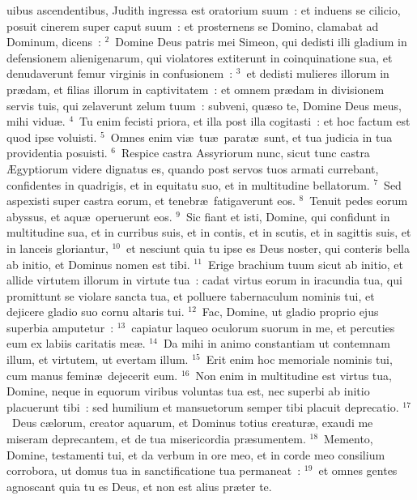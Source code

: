 \bchapter
{}uibus ascendentibus, Judith ingressa est oratorium suum~: et induens se cilicio, posuit cinerem super caput suum~: et prosternens se Domino, clamabat ad Dominum, dicens~:
${}^{2}$~Domine Deus patris mei Simeon, qui dedisti illi gladium in defensionem alienigenarum, qui violatores extiterunt in coinquinatione sua, et denudaverunt femur virginis in confusionem~:
${}^{3}$~et dedisti mulieres illorum in pr\ae dam, et filias illorum in captivitatem~: et omnem pr\ae dam in divisionem servis tuis, qui zelaverunt zelum tuum~: subveni, qu\ae so te, Domine Deus meus, mihi vidu\ae .
${}^{4}$~Tu enim fecisti priora, et illa post illa cogitasti~: et hoc factum est quod ipse voluisti.
${}^{5}$~Omnes enim vi\ae\ tu\ae\ parat\ae\ sunt, et tua judicia in tua providentia posuisti.
${}^{6}$~Respice castra Assyriorum nunc, sicut tunc castra \AE gyptiorum videre dignatus es, quando post servos tuos armati currebant, confidentes in quadrigis, et in equitatu suo, et in multitudine bellatorum.
${}^{7}$~Sed aspexisti super castra eorum, et tenebr\ae\ fatigaverunt eos.
${}^{8}$~Tenuit pedes eorum abyssus, et aqu\ae\ operuerunt eos.
${}^{9}$~Sic fiant et isti, Domine, qui confidunt in multitudine sua, et in curribus suis, et in contis, et in scutis, et in sagittis suis, et in lanceis gloriantur,
${}^{10}$~et nesciunt quia tu ipse es Deus noster, qui conteris bella ab initio, et Dominus nomen est tibi.
${}^{11}$~Erige brachium tuum sicut ab initio, et allide virtutem illorum in virtute tua~: cadat virtus eorum in iracundia tua, qui promittunt se violare sancta tua, et polluere tabernaculum nominis tui, et dejicere gladio suo cornu altaris tui.
${}^{12}$~Fac, Domine, ut gladio proprio ejus superbia amputetur~:
${}^{13}$~capiatur laqueo oculorum suorum in me, et percuties eum ex labiis caritatis me\ae .
${}^{14}$~Da mihi in animo constantiam ut contemnam illum, et virtutem, ut evertam illum.
${}^{15}$~Erit enim hoc memoriale nominis tui, cum manus femin\ae\ dejecerit eum.
${}^{16}$~Non enim in multitudine est virtus tua, Domine, neque in equorum viribus voluntas tua est, nec superbi ab initio placuerunt tibi~: sed humilium et mansuetorum semper tibi placuit deprecatio.
${}^{17}$~Deus c\ae lorum, creator aquarum, et Dominus totius creatur\ae , exaudi me miseram deprecantem, et de tua misericordia pr\ae sumentem.
${}^{18}$~Memento, Domine, testamenti tui, et da verbum in ore meo, et in corde meo consilium corrobora, ut domus tua in sanctificatione tua permaneat~:
${}^{19}$~et omnes gentes agnoscant quia tu es Deus, et non est alius pr\ae ter te.

